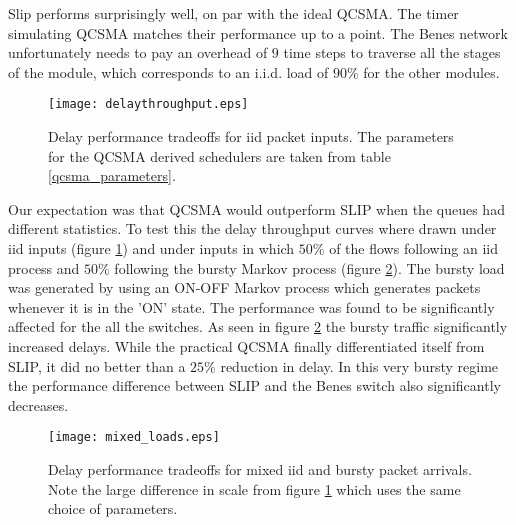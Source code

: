 \documentclass{IEEEtran}%
\begin{document}

Slip performs surprisingly well, on par with the ideal QCSMA.  The timer simulating QCSMA matches their performance up to a point.  The Benes network unfortunately needs to pay an overhead of $9$ time steps to traverse all the stages of the module, which corresponds to an i.i.d. load of $90\%$ for the other modules. 

\begin{figure}%
	 \texttt{[image: delaythroughput.eps]}
	\caption{Delay performance tradeoffs for iid packet inputs. The parameters for the QCSMA derived schedulers are taken from table \ref{qcsma_parameters}.} 	
	\label{delay_graphs}
\end{figure}


 Our expectation was that QCSMA would outperform SLIP when the queues had different statistics.  To test this the delay throughput curves where drawn under iid inputs (figure \ref{delay_graphs}) and under inputs in which $50\%$ of the flows following an iid process and $50\%$ following the bursty Markov process (figure \ref{mixed_loads}).   The bursty load was generated by using an ON-OFF Markov process which generates packets whenever it is in the 'ON' state.  The performance was found to be significantly affected for the all the switches.  As seen in figure \ref{mixed_loads} the bursty traffic significantly increased delays.  While the practical QCSMA finally differentiated itself from SLIP, it did no better than a $25\%$ reduction in delay.  In this very bursty regime the performance difference between SLIP and the Benes switch also significantly decreases.

\begin{figure}%
	 \texttt{[image: mixed\_loads.eps]}
	\caption{Delay performance tradeoffs for mixed iid and bursty packet arrivals. Note the large difference in scale from figure \ref{delay_graphs} which uses the same choice of parameters.} 	
	\label{mixed_loads}
\end{figure}



\end{document}
